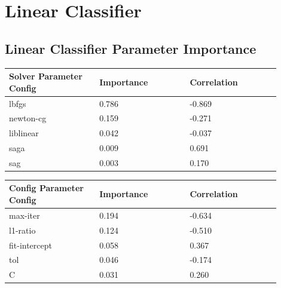 \documentclass[11pt]{article}
\begin{document}
\section{Linear Classifier}

\subsection{Linear Classifier Parameter Importance}
  \begin{table}[ht]
    \centering
    \begin{tabular}{|p{0.3\linewidth} | p{0.3\linewidth}| p{0.3\linewidth}|} 
      \hline
      \textbf{Solver Parameter Config}  & \textbf{Importance} & \textbf{Correlation} \\ \hline
      lbfgs & 0.786 & -0.869 \\ \hline
      newton-cg & 0.159 & -0.271 \\ \hline
      liblinear & 0.042 & -0.037 \\ \hline
      saga & 0.009 & 0.691 \\ \hline
      sag & 0.003 & 0.170 \\ \hline
    \end{tabular}
  \end{table}\label{LC_ParamImp1}

  \begin{table}[ht]
    \centering
    \begin{tabular}{|p{0.3\linewidth} | p{0.3\linewidth}| p{0.3\linewidth}|} 
      \hline
      \textbf{Config Parameter Config}  & \textbf{Importance} & \textbf{Correlation} \\ \hline
      max-iter & 0.194 & -0.634 \\ \hline
      l1-ratio & 0.124 & -0.510 \\ \hline
      fit-intercept & 0.058 & 0.367 \\ \hline
      tol & 0.046 & -0.174 \\ \hline
      C & 0.031 & 0.260 \\ \hline
    \end{tabular}
  \end{table}\label{LC_ParamImp2}
\end{document}
